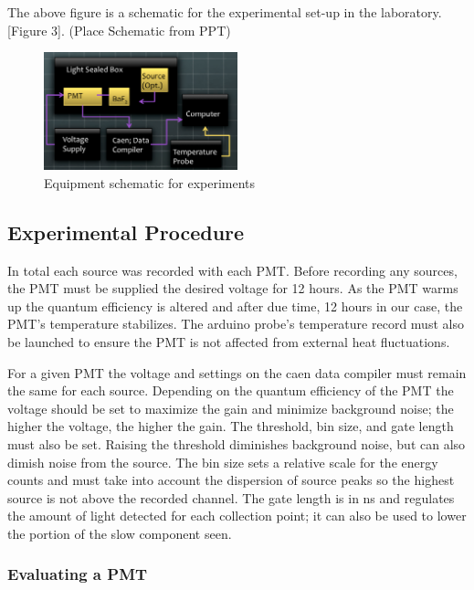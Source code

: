 \documentclass{article}
\begin{document}
\noindent
The above figure is a schematic for the experimental set-up in the laboratory. [Figure 3]. (Place Schematic from PPT)

\begin{figure}
  \centering
    \includegraphics[width=0.5\textwidth]{schem.png}
  \caption{Equipment schematic for experiments}
  \label{fig:workflowedge}
\end{figure} 

\subsection{Experimental Procedure}

In total each source was recorded with each PMT. Before recording any sources, the PMT must be supplied the desired voltage for 12 hours. As the PMT warms up the quantum efficiency is altered and after due time, 12 hours in our case, the PMT's temperature stabilizes. The arduino probe's temperature record must also be launched to ensure the PMT is not affected from external heat fluctuations. 

For a given PMT the voltage and settings on the caen data compiler must remain the same for each source. Depending on the quantum efficiency of the PMT the voltage should be set to maximize the gain and minimize background noise;  the higher the voltage, the higher the gain. The threshold, bin size, and gate length must also be set. Raising the threshold diminishes background noise, but can also dimish noise from the source. The bin size sets a relative scale for the energy counts and must take into account the dispersion of source peaks so the highest source is not above the recorded channel. The gate length is in ns and regulates the amount of light detected for each collection point; it can also be used to lower the portion of the slow component seen. 

\subsubsection{Evaluating a PMT}
\end{document}
